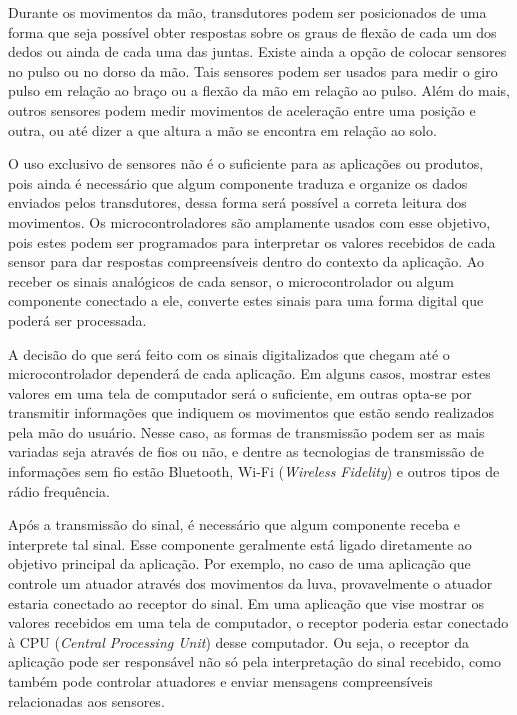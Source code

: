 \documentclass[
	12pt,				%
	openright,			%
	oneside,			%
	a4paper,			%
	english,			%
	brazil				%
	]{abntex2}
\begin{document}
		Durante os movimentos da mão, transdutores podem ser posicionados de uma forma que seja possível obter respostas sobre os graus de flexão de cada um dos dedos ou ainda de cada uma das juntas. Existe ainda a opção de colocar sensores no pulso ou no dorso da mão. Tais sensores podem ser usados para medir o giro pulso em relação ao braço ou a flexão da mão em relação ao pulso. Além do mais, outros sensores podem medir movimentos de aceleração entre uma posição e outra, ou até dizer a que altura a mão se encontra em relação ao solo.
		
		O uso exclusivo de sensores não é o suficiente para as aplicações ou produtos, pois ainda é necessário que algum componente traduza e organize os dados enviados pelos transdutores, dessa forma será possível a correta leitura dos movimentos. Os microcontroladores são amplamente usados com esse objetivo, pois estes podem ser programados para interpretar os valores recebidos de cada sensor para dar respostas compreensíveis dentro do contexto da aplicação. Ao receber os sinais analógicos de cada sensor, o microcontrolador ou algum componente conectado a ele, converte estes sinais para uma forma digital que poderá ser processada. 
	
		A decisão do que será feito com os sinais digitalizados que chegam até o microcontrolador dependerá de cada aplicação. Em alguns casos, mostrar estes valores em uma tela de computador será o suficiente, em outras opta-se por transmitir informações que indiquem os movimentos que estão sendo realizados pela mão do usuário. Nesse caso, as formas de transmissão podem ser as mais variadas seja através de fios ou não, e dentre as tecnologias de transmissão de informações sem fio estão Bluetooth, Wi-Fi (\textit{Wireless Fidelity}) e outros tipos de rádio frequência.

		Após a transmissão do sinal, é necessário que algum componente receba e interprete tal sinal. Esse componente geralmente está ligado diretamente ao objetivo principal da aplicação. Por exemplo, no caso de uma aplicação que controle um atuador através dos movimentos da luva, provavelmente o atuador estaria conectado ao receptor do sinal. Em uma aplicação que vise mostrar os valores recebidos em uma tela de computador, o receptor poderia estar conectado à CPU (\textit{Central Processing Unit}) desse computador. Ou seja, o receptor da aplicação pode ser responsável não só pela interpretação do sinal recebido, como também pode controlar atuadores e enviar mensagens compreensíveis relacionadas aos sensores.
\end{document}
